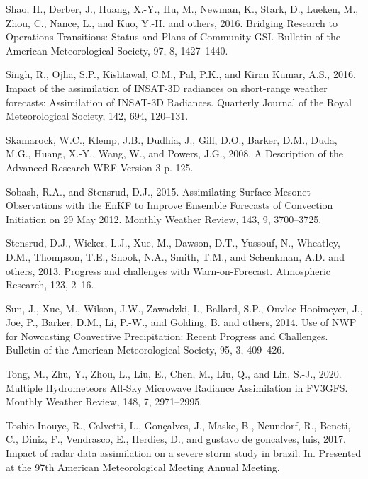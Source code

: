 \documentclass[12pt,oneside,a4paper]{reedthesis}
\begin{document}
\leavevmode\hypertarget{ref-shao2016}{}%
Shao, H., Derber, J., Huang, X.-Y., Hu, M., Newman, K., Stark, D., Lueken, M., Zhou, C., Nance, L., and Kuo, Y.-H. and others, 2016. Bridging Research to Operations Transitions: Status and Plans of Community GSI. Bulletin of the American Meteorological Society, 97, 8, 1427--1440.

\leavevmode\hypertarget{ref-singh2016}{}%
Singh, R., Ojha, S.P., Kishtawal, C.M., Pal, P.K., and Kiran Kumar, A.S., 2016. Impact of the assimilation of INSAT-3D radiances on short-range weather forecasts: Assimilation of INSAT-3D Radiances. Quarterly Journal of the Royal Meteorological Society, 142, 694, 120--131.

\leavevmode\hypertarget{ref-skamarock2008}{}%
Skamarock, W.C., Klemp, J.B., Dudhia, J., Gill, D.O., Barker, D.M., Duda, M.G., Huang, X.-Y., Wang, W., and Powers, J.G., 2008. A Description of the Advanced Research WRF Version 3 p. 125.

\leavevmode\hypertarget{ref-sobash2015}{}%
Sobash, R.A., and Stensrud, D.J., 2015. Assimilating Surface Mesonet Observations with the EnKF to Improve Ensemble Forecasts of Convection Initiation on 29 May 2012. Monthly Weather Review, 143, 9, 3700--3725.

\leavevmode\hypertarget{ref-stensrud2013}{}%
Stensrud, D.J., Wicker, L.J., Xue, M., Dawson, D.T., Yussouf, N., Wheatley, D.M., Thompson, T.E., Snook, N.A., Smith, T.M., and Schenkman, A.D. and others, 2013. Progress and challenges with Warn-on-Forecast. Atmospheric Research, 123, 2--16.

\leavevmode\hypertarget{ref-sun2014}{}%
Sun, J., Xue, M., Wilson, J.W., Zawadzki, I., Ballard, S.P., Onvlee-Hooimeyer, J., Joe, P., Barker, D.M., Li, P.-W., and Golding, B. and others, 2014. Use of NWP for Nowcasting Convective Precipitation: Recent Progress and Challenges. Bulletin of the American Meteorological Society, 95, 3, 409--426.

\leavevmode\hypertarget{ref-tong2020}{}%
Tong, M., Zhu, Y., Zhou, L., Liu, E., Chen, M., Liu, Q., and Lin, S.-J., 2020. Multiple Hydrometeors All-Sky Microwave Radiance Assimilation in FV3GFS. Monthly Weather Review, 148, 7, 2971--2995.

\leavevmode\hypertarget{ref-toshioinouye2017}{}%
Toshio Inouye, R., Calvetti, L., Gonçalves, J., Maske, B., Neundorf, R., Beneti, C., Diniz, F., Vendrasco, E., Herdies, D., and gustavo de goncalves, luis, 2017. Impact of radar data assimilation on a severe storm study in brazil. In. Presented at the 97th American Meteorological Meeting Annual Meeting.
\end{document}
